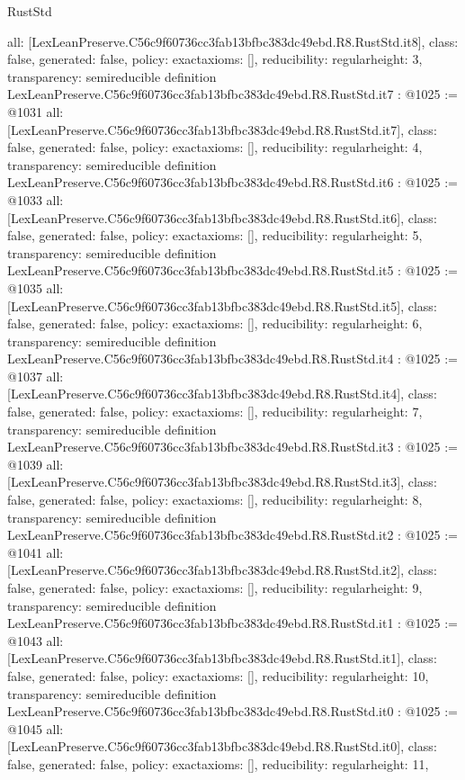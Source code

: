 \begin{lexlean}{RustStd}
\begin{coremodule}
{  all: [LexLeanPreserve.C56c9f60736cc3fab13bfbc383dc49ebd.R8.RustStd.it8],
  class: false,
  generated: false,
  policy: exact{axioms: []},
  reducibility: regular{height: 3},
  transparency: semireducible
}
definition LexLeanPreserve.C56c9f60736cc3fab13bfbc383dc49ebd.R8.RustStd.it7 : @1025 := @1031 {
  all: [LexLeanPreserve.C56c9f60736cc3fab13bfbc383dc49ebd.R8.RustStd.it7],
  class: false,
  generated: false,
  policy: exact{axioms: []},
  reducibility: regular{height: 4},
  transparency: semireducible
}
definition LexLeanPreserve.C56c9f60736cc3fab13bfbc383dc49ebd.R8.RustStd.it6 : @1025 := @1033 {
  all: [LexLeanPreserve.C56c9f60736cc3fab13bfbc383dc49ebd.R8.RustStd.it6],
  class: false,
  generated: false,
  policy: exact{axioms: []},
  reducibility: regular{height: 5},
  transparency: semireducible
}
definition LexLeanPreserve.C56c9f60736cc3fab13bfbc383dc49ebd.R8.RustStd.it5 : @1025 := @1035 {
  all: [LexLeanPreserve.C56c9f60736cc3fab13bfbc383dc49ebd.R8.RustStd.it5],
  class: false,
  generated: false,
  policy: exact{axioms: []},
  reducibility: regular{height: 6},
  transparency: semireducible
}
definition LexLeanPreserve.C56c9f60736cc3fab13bfbc383dc49ebd.R8.RustStd.it4 : @1025 := @1037 {
  all: [LexLeanPreserve.C56c9f60736cc3fab13bfbc383dc49ebd.R8.RustStd.it4],
  class: false,
  generated: false,
  policy: exact{axioms: []},
  reducibility: regular{height: 7},
  transparency: semireducible
}
definition LexLeanPreserve.C56c9f60736cc3fab13bfbc383dc49ebd.R8.RustStd.it3 : @1025 := @1039 {
  all: [LexLeanPreserve.C56c9f60736cc3fab13bfbc383dc49ebd.R8.RustStd.it3],
  class: false,
  generated: false,
  policy: exact{axioms: []},
  reducibility: regular{height: 8},
  transparency: semireducible
}
definition LexLeanPreserve.C56c9f60736cc3fab13bfbc383dc49ebd.R8.RustStd.it2 : @1025 := @1041 {
  all: [LexLeanPreserve.C56c9f60736cc3fab13bfbc383dc49ebd.R8.RustStd.it2],
  class: false,
  generated: false,
  policy: exact{axioms: []},
  reducibility: regular{height: 9},
  transparency: semireducible
}
definition LexLeanPreserve.C56c9f60736cc3fab13bfbc383dc49ebd.R8.RustStd.it1 : @1025 := @1043 {
  all: [LexLeanPreserve.C56c9f60736cc3fab13bfbc383dc49ebd.R8.RustStd.it1],
  class: false,
  generated: false,
  policy: exact{axioms: []},
  reducibility: regular{height: 10},
  transparency: semireducible
}
definition LexLeanPreserve.C56c9f60736cc3fab13bfbc383dc49ebd.R8.RustStd.it0 : @1025 := @1045 {
  all: [LexLeanPreserve.C56c9f60736cc3fab13bfbc383dc49ebd.R8.RustStd.it0],
  class: false,
  generated: false,
  policy: exact{axioms: []},
  reducibility: regular{height: 11},
}
\end{coremodule}
\end{lexlean}
